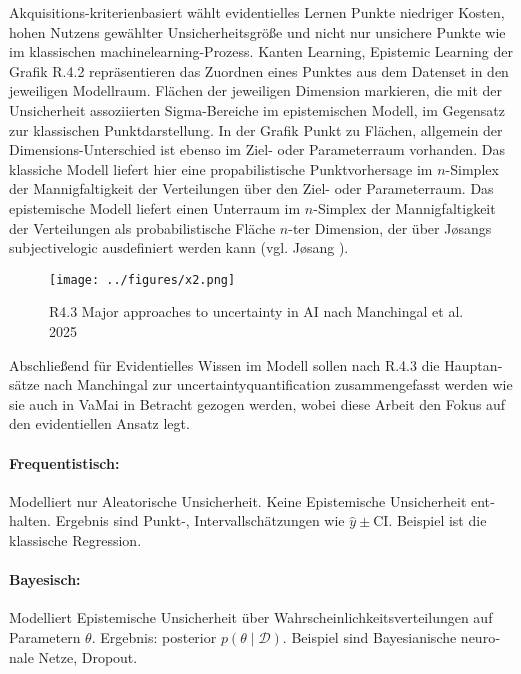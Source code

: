 \begin{otherlanguage}{ngerman}
Akquisitions-kriterienbasiert wählt evidentielles Lernen Punkte niedriger Kosten, hohen Nutzens gewählter Unsicherheitsgröße und nicht nur unsichere Punkte wie im klassischen \gls{machinelearning}-Prozess. Kanten \glqq{}Learning\grqq{}, \glqq{}Epistemic Learning\grqq{} der Grafik R.4.2 repräsentieren das Zuordnen eines Punktes aus dem Datenset in den jeweiligen Modellraum. Flächen der jeweiligen Dimension markieren, die mit der Unsicherheit assoziierten Sigma-Bereiche im epistemischen Modell, im Gegensatz zur klassischen Punktdarstellung. In der Grafik Punkt zu Flächen, allgemein der Dimensions-Unterschied ist ebenso im Ziel- oder Parameterraum vorhanden. Das klassiche Modell liefert hier eine propabilistische Punktvorhersage im $n$-Simplex der Mannigfaltigkeit der Verteilungen über den Ziel- oder Parameterraum. Das epistemische Modell liefert einen Unterraum im $n$-Simplex der Mannigfaltigkeit der Verteilungen als probabilistische Fläche $n$-ter Dimension, der über Jøsangs \gls{subjectivelogic} ausdefiniert werden kann (vgl. Jøsang \parencite{subjectivelogic}).

\begin{figure}[!ht]
  \centering
  \texttt{[image: ../figures/x2.png]}
  \caption{R4.3 \glqq{}Major approaches to uncertainty in AI\grqq{} nach Manchingal et al. 2025}
\end{figure}

Abschließend für Evidentielles Wissen im Modell sollen nach R.4.3 die Hauptansätze nach Manchingal zur \gls{uncertaintyquantification} zusammengefasst werden wie sie auch in VaMai in Betracht gezogen werden, wobei diese Arbeit den Fokus auf den evidentiellen Ansatz legt.

\paragraph{Frequentistisch:} Modelliert nur \gls{Aleatorische Unsicherheit}. Keine \gls{Epistemische Unsicherheit} enthalten. Ergebnis sind Punkt-, Intervallschätzungen wie 
\(\hat{y} \pm \text{CI}\). Beispiel ist die klassische Regression.

\paragraph{Bayesisch:} Modelliert \gls{Epistemische Unsicherheit} über Wahrscheinlichkeitsverteilungen auf Parametern \(\theta\). Ergebnis: posterior 
\(p(\theta \mid \mathcal{D})\). Beispiel sind \gls{Bayesianische neuronale Netze}, Dropout.


\end{otherlanguage}
